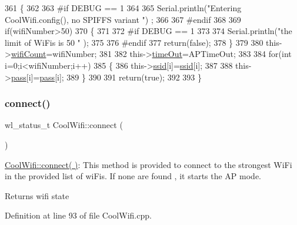 \begin{DoxyCode}
361 \{
362 
363 \textcolor{preprocessor}{#if DEBUG == 1 }
364     
365     Serial.println(\textcolor{stringliteral}{"Entering CoolWifi.config(), no SPIFFS variant "}) ;
366     
367 \textcolor{preprocessor}{#endif}
368     
369     \textcolor{keywordflow}{if}(wifiNumber>50)
370     \{
371     
372 \textcolor{preprocessor}{    #if DEBUG == 1 }
373         
374         Serial.println(\textcolor{stringliteral}{"the limit of WiFis is 50 "} );
375         
376 \textcolor{preprocessor}{    #endif}
377         \textcolor{keywordflow}{return}(\textcolor{keyword}{false});  
378     \}
379 
380     this->\hyperlink{classCoolWifi_ab133bd92fcb895b884deecd6678592e4}{wifiCount}=wifiNumber;
381 
382     this->\hyperlink{classCoolWifi_a952111605f25156588b5632caaba1c6f}{timeOut}=APTimeOut;
383     
384     \textcolor{keywordflow}{for}(\textcolor{keywordtype}{int} i=0;i<wifiNumber;i++)
385     \{
386         this->\hyperlink{classCoolWifi_a893b21d0fed821438733bba2e73fb4c2}{ssid}[i]=\hyperlink{classCoolWifi_a893b21d0fed821438733bba2e73fb4c2}{ssid}[i];
387         
388         this->\hyperlink{classCoolWifi_a0c3332a149245aaad060b32593a54c9b}{pass}[i]=\hyperlink{classCoolWifi_a0c3332a149245aaad060b32593a54c9b}{pass}[i];
389     \}
390         
391     \textcolor{keywordflow}{return}(\textcolor{keyword}{true});
392 
393 \}
\end{DoxyCode}
\mbox{\label{classCoolWifi_ad060353050f40d032a2dbf9e54a768bf}} 
\subsubsection{\texorpdfstring{connect()}{connect()}}
{\footnotesize\ttfamily wl\+\_\+status\+\_\+t Cool\+Wifi\+::connect (\begin{DoxyParamCaption}{ }\end{DoxyParamCaption})}

\hyperlink{classCoolWifi_ad060353050f40d032a2dbf9e54a768bf}{Cool\+Wifi\+::connect( )}\+: This method is provided to connect to the strongest Wi\+Fi in the provided list of wi\+Fis. If none are found , it starts the AP mode.

\begin{DoxyReturn}{Returns}
wifi state 
\end{DoxyReturn}


Definition at line 93 of file Cool\+Wifi.\+cpp.



